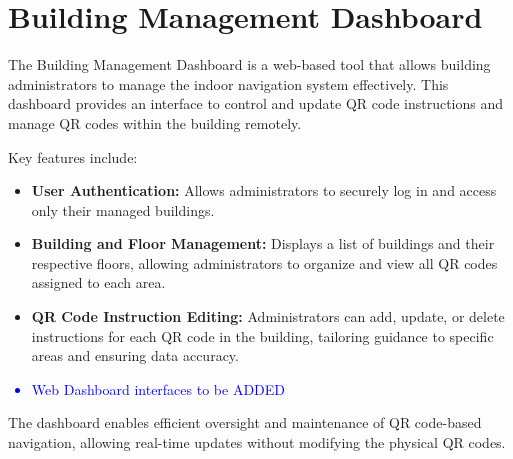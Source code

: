 \section{Building Management Dashboard}

The Building Management Dashboard is a web-based tool that allows building administrators to manage the indoor navigation system effectively. This dashboard provides an interface to control and update QR code instructions and manage QR codes within the building remotely.

Key features include:
\begin{itemize}
	\item \textbf{User Authentication:} Allows administrators to securely log in and access only their managed buildings.
	\item \textbf{Building and Floor Management:} Displays a list of buildings and their respective floors, allowing administrators to organize and view all QR codes assigned to each area.
	\item \textbf{QR Code Instruction Editing:} Administrators can add, update, or delete instructions for each QR code in the building, tailoring guidance to specific areas and ensuring data accuracy.
\end{itemize}

\textcolor{blue}{
	\begin{itemize}
		\item Web Dashboard interfaces to be ADDED
\end{itemize}}

The dashboard enables efficient oversight and maintenance of QR code-based navigation, allowing real-time updates without modifying the physical QR codes.